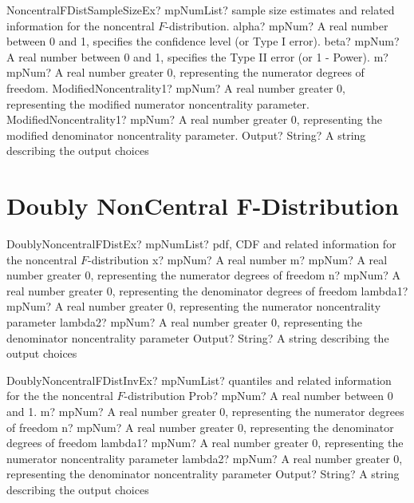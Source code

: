 \documentclass[12pt,a4paper,openany]{book}
\begin{document}
\begin{mpFunctionsExtract}
\mpFunctionSixNotImplemented
{NoncentralFDistSampleSizeEx? mpNumList? sample size estimates and related information for the noncentral $F$-distribution.}
{alpha? mpNum? A real number between 0 and 1, specifies the confidence level (or Type I error).}
{beta? mpNum?  A real number between 0 and 1, specifies the Type II error (or 1 - Power).}
{m? mpNum? A real number greater 0, representing the numerator  degrees of freedom.}
{ModifiedNoncentrality1? mpNum? A real number greater 0, representing the modified numerator noncentrality parameter.}
{ModifiedNoncentrality1? mpNum? A real number greater 0, representing the modified denominator noncentrality parameter.}
{Output? String? A string describing the output choices}
\end{mpFunctionsExtract}

\section{Doubly NonCentral F-Distribution}

\begin{mpFunctionsExtract}
\mpFunctionSixNotImplemented
{DoublyNoncentralFDistEx? mpNumList? pdf, CDF and related information for the noncentral $F$-distribution}
{x? mpNum? A real number}
{m? mpNum? A real number greater 0, representing the numerator  degrees of freedom}
{n? mpNum? A real number greater 0, representing the denominator degrees of freedom}
{lambda1? mpNum? A real number greater 0, representing the numerator noncentrality parameter}
{lambda2? mpNum? A real number greater 0, representing the denominator noncentrality parameter}
{Output? String? A string describing the output choices}
\end{mpFunctionsExtract}

\begin{mpFunctionsExtract}
\mpFunctionSixNotImplemented
{DoublyNoncentralFDistInvEx? mpNumList? quantiles and related information for the the noncentral $F$-distribution}
{Prob? mpNum? A real number between 0 and 1.}
{m? mpNum? A real number greater 0, representing the numerator  degrees of freedom}
{n? mpNum? A real number greater 0, representing the denominator degrees of freedom}
{lambda1? mpNum? A real number greater 0, representing the numerator noncentrality parameter}
{lambda2? mpNum? A real number greater 0, representing the denominator noncentrality parameter}
{Output? String? A string describing the output choices}
\end{mpFunctionsExtract}
\end{document}
